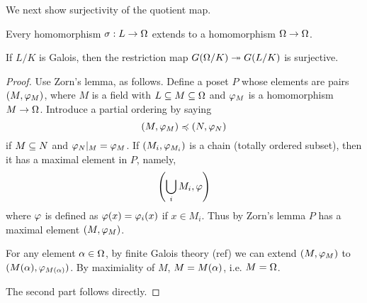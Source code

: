 We next show surjectivity of the quotient map.
\begin{pr}
Every homomorphism $\sigma:L\to \Omega$ extends to a homomorphism $\Omega\to \Omega$.

If $L/K$ is Galois, then the restriction map $G(\Omega/K)\twoheadrightarrow G(L/K)$ is surjective.
\end{pr}
\begin{proof}
Use Zorn's lemma, as follows. Define a poset $P$ whose elements are pairs $(M,\varphi_M)$, where $M$ is a field with $L\subseteq M\subseteq \Omega$ and $\varphi_M$ is a homomorphism $M\to \Omega$. Introduce a partial ordering by saying
\[
(M,\varphi_M)\preccurlyeq (N,\varphi_N)
\]
if $M\subseteq N$ and $\varphi_N|_M=\varphi_M$. If $(M_i,\varphi_{M_i})$ is a chain (totally ordered subset), then it has a maximal element in $P$, namely,
\[
\left( {\bigcup_i M_i,\varphi} \right)
\]
where $\varphi$ is defined as $\varphi(x)=\varphi_i(x)$ if $x\in M_i$. Thus by Zorn's lemma $P$ has a maximal element $(M,\varphi_M)$.

For any element $\alpha\in \Omega$, by finite Galois theory (ref) we can extend $(M,\varphi_M)$ to $(M(\alpha),\varphi_{M(\alpha)})$. By maximiality of $M$, $M=M(\alpha)$, i.e. $M=\Omega$.

The second part follows directly.
\end{proof}
